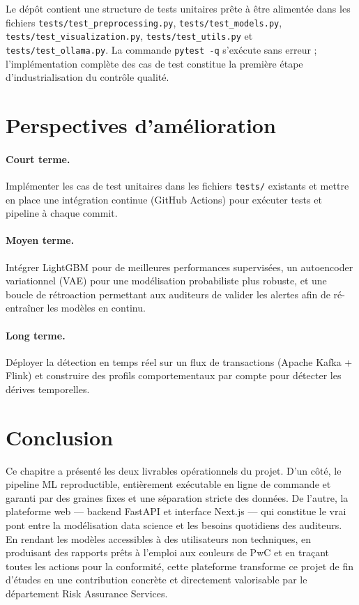 \documentclass[12pt,a4paper,twoside]{report}
\begin{document}
Le dépôt contient une structure de tests unitaires prête à être alimentée dans les fichiers \texttt{tests/test\_preprocessing.py}, \texttt{tests/test\_models.py}, \texttt{tests/test\_visualization.py}, \texttt{tests/test\_utils.py} et \texttt{tests/test\_ollama.py}. La commande \texttt{pytest -q} s'exécute sans erreur ; l'implémentation complète des cas de test constitue la première étape d'industrialisation du contrôle qualité.


\section{Perspectives d'amélioration}

\paragraph{Court terme.} Implémenter les cas de test unitaires dans les fichiers \texttt{tests/} existants et mettre en place une intégration continue (GitHub Actions) pour exécuter tests et pipeline à chaque commit.

\paragraph{Moyen terme.} Intégrer LightGBM pour de meilleures performances supervisées, un autoencoder variationnel (VAE) pour une modélisation probabiliste plus robuste, et une boucle de rétroaction permettant aux auditeurs de valider les alertes afin de ré-entraîner les modèles en continu.

\paragraph{Long terme.} Déployer la détection en temps réel sur un flux de transactions (Apache Kafka + Flink) et construire des profils comportementaux par compte pour détecter les dérives temporelles.


\section{Conclusion}

Ce chapitre a présenté les deux livrables opérationnels du projet. D'un côté, le pipeline ML reproductible, entièrement exécutable en ligne de commande et garanti par des graines fixes et une séparation stricte des données. De l'autre, la plateforme web --- backend FastAPI et interface Next.js --- qui constitue le vrai pont entre la modélisation data science et les besoins quotidiens des auditeurs. En rendant les modèles accessibles à des utilisateurs non techniques, en produisant des rapports prêts à l'emploi aux couleurs de PwC et en traçant toutes les actions pour la conformité, cette plateforme transforme ce projet de fin d'études en une contribution concrète et directement valorisable par le département Risk Assurance Services.
\end{document}
